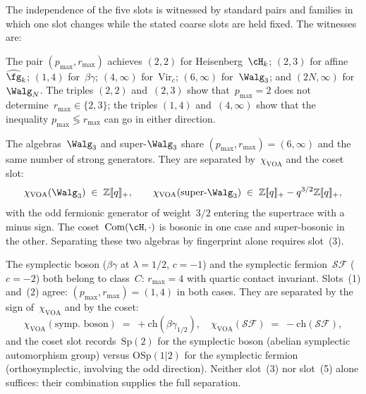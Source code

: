 The independence of the five slots is witnessed by standard pairs and
families in which one slot changes while the stated coarse slots are
held fixed. The witnesses are:

\begin{example}
\label{ex:fingerprint-p-r-independence}
The pair $(p_{\max}, r_{\max})$ achieves
$(2, 2)$ for Heisenberg~$\cH_k$;
$(2, 3)$ for affine~$\widehat{\fg}_k$;
$(1, 4)$ for~$\beta\gamma$;
$(4, \infty)$ for~$\mathrm{Vir}_c$;
$(6, \infty)$ for~$\Walg_3$;
and $(2N, \infty)$ for~$\Walg_N$. The triples $(2, 2)$ and~$(2, 3)$
show that~$p_{\max} = 2$ does not determine~$r_{\max}\in\{2,3\}$;
the triples $(1, 4)$ and~$(4, \infty)$ show that the inequality
$p_{\max} \lessgtr r_{\max}$ can go in either direction.
\end{example}

\begin{example}
\label{ex:super-w3-vs-w3}
The algebras~$\Walg_3$ and super-$\Walg_3$ share
$(p_{\max}, r_{\max}) = (6, \infty)$ and the same number of strong
generators. They are separated by~$\chi_{\mathrm{VOA}}$ and the coset
slot:
\[
\chi_{\mathrm{VOA}}(\Walg_3) \;\in\; \mathbb{Z}[\![q]\!]_{+}, \qquad
\chi_{\mathrm{VOA}}(\text{super-}\Walg_3) \;\in\; \mathbb{Z}[\![q]\!]_{+} - q^{3/2}\mathbb{Z}[\![q]\!]_{+},
\]
with the odd fermionic generator of weight~$3/2$ entering the
supertrace with a minus sign. The coset~$\mathrm{Com}(\cH, \cdot)$
is bosonic in one case and super-bosonic in the other. Separating
these two algebras by fingerprint alone requires slot~(3).
\end{example}

\begin{example}
\label{ex:symplectic-boson-vs-fermion}
The symplectic boson ($\beta\gamma$ at $\lambda = 1/2$, $c = -1$)
and the symplectic fermion~$\mathcal{SF}$ ($c = -2$) both belong to
class~$C$: $r_{\max} = 4$ with quartic contact invariant.
Slots~(1) and~(2) agree:
$(p_{\max}, r_{\max}) = (1, 4)$ in both cases. They are separated by
the sign of~$\chi_{\mathrm{VOA}}$ and by the coset:
\[
\chi_{\mathrm{VOA}}(\text{symp.\ boson})\;=\;+\mathrm{ch}(\beta\gamma_{1/2}), \quad
\chi_{\mathrm{VOA}}(\mathcal{SF})\;=\;-\mathrm{ch}(\mathcal{SF}),
\]
and the coset slot records~$\mathrm{Sp}(2)$ for the symplectic boson
(abelian symplectic automorphism group) versus
$\mathrm{OSp}(1|2)$ for the symplectic fermion (orthosymplectic,
involving the odd direction). Neither slot~(3) nor slot~(5) alone
suffices: their combination supplies the full separation.
\end{example}

